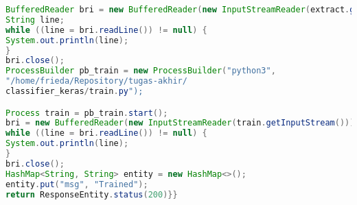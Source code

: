 \begin{lstlisting}[language=Java, caption=Implementasi Backend, label=code:api, firstnumber=0]
BufferedReader bri = new BufferedReader(new InputStreamReader(extract.getInputStream()));
String line;
while ((line = bri.readLine()) != null) {
System.out.println(line);
}
bri.close();
ProcessBuilder pb_train = new ProcessBuilder("python3",
"/home/frieda/Repository/tugas-akhir/
classifier_keras/train.py");

Process train = pb_train.start();
bri = new BufferedReader(new InputStreamReader(train.getInputStream()));
while ((line = bri.readLine()) != null) {
System.out.println(line);
}
bri.close();
HashMap<String, String> entity = new HashMap<>();
entity.put("msg", "Trained");
return ResponseEntity.status(200)}}
\end{lstlisting}
